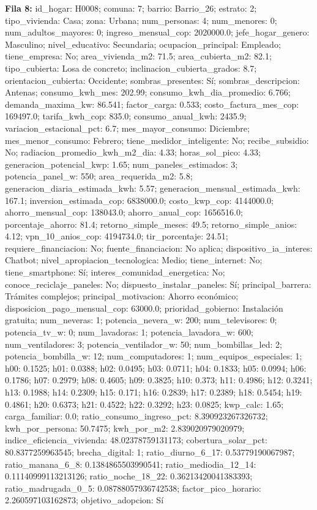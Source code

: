 {\footnotesize\textbf{Fila 8:} id\_hogar: H0008; comuna: 7; barrio: Barrio\_26; estrato: 2; tipo\_vivienda: Casa; zona: Urbana; num\_personas: 4; num\_menores: 0; num\_adultos\_mayores: 0; ingreso\_mensual\_cop: 2020000.0; jefe\_hogar\_genero: Masculino; nivel\_educativo: Secundaria; ocupacion\_principal: Empleado; tiene\_empresa: No; area\_vivienda\_m2: 71.5; area\_cubierta\_m2: 82.1; tipo\_cubierta: Losa de concreto; inclinacion\_cubierta\_grados: 8.7; orientacion\_cubierta: Occidente; sombras\_presentes: Sí; sombras\_descripcion: Antenas; consumo\_kwh\_mes: 202.99; consumo\_kwh\_dia\_promedio: 6.766; demanda\_maxima\_kw: 86.541; factor\_carga: 0.533; costo\_factura\_mes\_cop: 169497.0; tarifa\_kwh\_cop: 835.0; consumo\_anual\_kwh: 2435.9; variacion\_estacional\_pct: 6.7; mes\_mayor\_consumo: Diciembre; mes\_menor\_consumo: Febrero; tiene\_medidor\_inteligente: No; recibe\_subsidio: No; radiacion\_promedio\_kwh\_m2\_dia: 4.33; horas\_sol\_pico: 4.33; generacion\_potencial\_kwp: 1.65; num\_paneles\_estimados: 3; potencia\_panel\_w: 550; area\_requerida\_m2: 5.8; generacion\_diaria\_estimada\_kwh: 5.57; generacion\_mensual\_estimada\_kwh: 167.1; inversion\_estimada\_cop: 6838000.0; costo\_kwp\_cop: 4144000.0; ahorro\_mensual\_cop: 138043.0; ahorro\_anual\_cop: 1656516.0; porcentaje\_ahorro: 81.4; retorno\_simple\_meses: 49.5; retorno\_simple\_anios: 4.12; vpn\_10\_anios\_cop: 4194734.0; tir\_porcentaje: 24.51; requiere\_financiacion: No; fuente\_financiacion: No aplica; dispositivo\_ia\_interes: Chatbot; nivel\_apropiacion\_tecnologica: Medio; tiene\_internet: No; tiene\_smartphone: Sí; interes\_comunidad\_energetica: No; conoce\_reciclaje\_paneles: No; dispuesto\_instalar\_paneles: Sí; principal\_barrera: Trámites complejos; principal\_motivacion: Ahorro económico; disposicion\_pago\_mensual\_cop: 63000.0; prioridad\_gobierno: Instalación gratuita; num\_neveras: 1; potencia\_nevera\_w: 200; num\_televisores: 0; potencia\_tv\_w: 0; num\_lavadoras: 1; potencia\_lavadora\_w: 600; num\_ventiladores: 3; potencia\_ventilador\_w: 50; num\_bombillas\_led: 2; potencia\_bombilla\_w: 12; num\_computadores: 1; num\_equipos\_especiales: 1; h00: 0.1525; h01: 0.0388; h02: 0.0495; h03: 0.0711; h04: 0.1833; h05: 0.0994; h06: 0.1786; h07: 0.2979; h08: 0.4605; h09: 0.3825; h10: 0.373; h11: 0.4986; h12: 0.3241; h13: 0.1988; h14: 0.2309; h15: 0.171; h16: 0.2839; h17: 0.2389; h18: 0.5454; h19: 0.4861; h20: 0.6373; h21: 0.4522; h22: 0.3292; h23: 0.0825; kwp\_calc: 1.65; carga\_familiar: 0.0; ratio\_consumo\_ingreso\_pct: 8.390923267326732; kwh\_por\_persona: 50.7475; kwh\_por\_m2: 2.839020979020979; indice\_eficiencia\_vivienda: 48.02378759131173; cobertura\_solar\_pct: 80.8377259963545; brecha\_digital: 1; ratio\_diurno\_6\_17: 0.53779190067987; ratio\_manana\_6\_8: 0.1384865503990541; ratio\_mediodia\_12\_14: 0.11140999113213126; ratio\_noche\_18\_22: 0.36213420041383393; ratio\_madrugada\_0\_5: 0.08788057936742538; factor\_pico\_horario: 2.260597103162873; objetivo\_adopcion: Sí\par}
